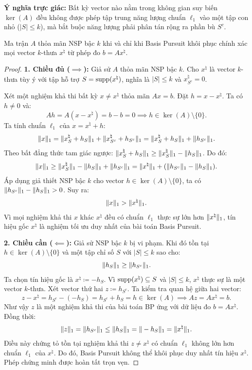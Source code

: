 \textbf{Ý nghĩa trực giác:} Bất kỳ vector nào nằm trong không gian suy biến $\ker(A)$ đều không được phép tập trung năng lượng chuẩn $\ell_1$ vào một tập con nhỏ ($|S| \le k$), mà bắt buộc năng lượng phải phân tán rộng ra phần bù $S^c$.

\begin{theorem}
Ma trận $A$ thỏa mãn NSP bậc $k$ khi và chỉ khi Basis Pursuit khôi phục chính xác mọi vector $k$-thưa $x^\natural$ từ phép đo $b = Ax^\natural$.
\end{theorem}

\begin{proof}
\textbf{1. Chiều đủ ($\implies$):} 
Giả sử $A$ thỏa mãn NSP bậc $k$. Cho $x^\natural$ là vector $k$-thưa tùy ý với tập hỗ trợ $S = \operatorname{supp}(x^\natural)$, nghĩa là $|S| \le k$ và $x^\natural_{S^c} = 0$. 

Xét một nghiệm khả thi bất kỳ $x \ne x^\natural$ thỏa mãn $Ax = b$. Đặt $h = x - x^\natural$. Ta có $h \ne 0$ và:
\[
Ah = A(x - x^\natural) = b - b = 0 \implies h \in \ker(A) \setminus \{0\}.
\]
Ta tính chuẩn $\ell_1$ của $x = x^\natural + h$:
\[
\|x\|_1 = \|x^\natural_S + h_S\|_1 + \|x^\natural_{S^c} + h_{S^c}\|_1 = \|x^\natural_S + h_S\|_1 + \|h_{S^c}\|_1.
\]
Theo bất đẳng thức tam giác ngược: $\|x^\natural_S + h_S\|_1 \ge \|x^\natural_S\|_1 - \|h_S\|_1$. Do đó:
\[
\|x\|_1 \ge \|x^\natural_S\|_1 - \|h_S\|_1 + \|h_{S^c}\|_1 = \|x^\natural\|_1 + (\|h_{S^c}\|_1 - \|h_S\|_1).
\]
Áp dụng giả thiết NSP bậc $k$ cho vector $h \in \ker(A) \setminus \{0\}$, ta có $\|h_{S^c}\|_1 - \|h_S\|_1 > 0$. Suy ra:
\[
\|x\|_1 > \|x^\natural\|_1.
\]
Vì mọi nghiệm khả thi $x$ khác $x^\natural$ đều có chuẩn $\ell_1$ thực sự lớn hơn $\|x^\natural\|_1$, tín hiệu gốc $x^\natural$ là nghiệm tối ưu duy nhất của bài toán Basis Pursuit.

\textbf{2. Chiều cần ($\impliedby$):} 
Giả sử NSP bậc $k$ bị vi phạm. Khi đó tồn tại $h \in \ker(A) \setminus \{0\}$ và một tập chỉ số $S$ với $|S| \le k$ sao cho:
\[
\|h_S\|_1 \ge \|h_{S^c}\|_1.
\]
Ta chọn tín hiệu gốc là $x^\natural \coloneqq -h_S$. Vì $\operatorname{supp}(x^\natural) \subseteq S$ và $|S| \le k$, $x^\natural$ thực sự là một vector $k$-thưa. Xét vector thứ hai $z \coloneqq h_{S^c}$. Ta kiểm tra quan hệ giữa hai vector:
\[
z - x^\natural = h_{S^c} - (-h_S) = h_{S^c} + h_S = h \in \ker(A) \implies Az = Ax^\natural = b.
\]
Như vậy $z$ là một nghiệm khả thi của bài toán BP ứng với dữ liệu đo $b = Ax^\natural$. Đồng thời:
\[
\|z\|_1 = \|h_{S^c}\|_1 \le \|h_S\|_1 = \|-h_S\|_1 = \|x^\natural\|_1.
\]
Điều này chứng tỏ tồn tại nghiệm khả thi $z \ne x^\natural$ có chuẩn $\ell_1$ không lớn hơn chuẩn $\ell_1$ của $x^\natural$. Do đó, Basis Pursuit không thể khôi phục duy nhất tín hiệu $x^\natural$. Phép chứng minh được hoàn tất trọn vẹn.
\end{proof}

